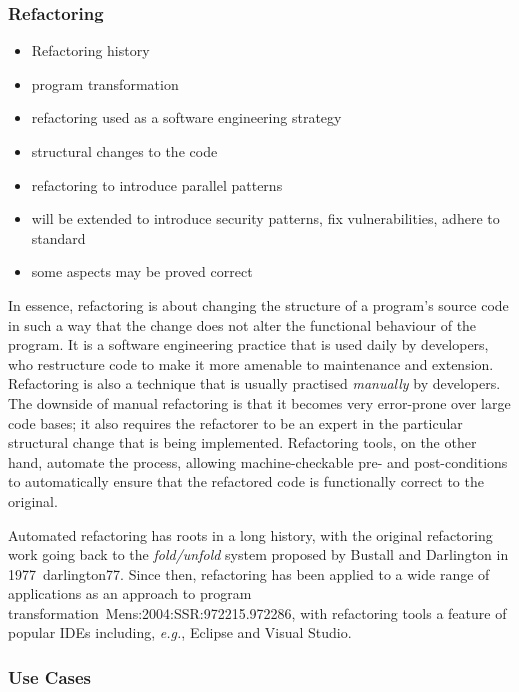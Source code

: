 \documentclass[a4paper,11pt]{article}
\begin{document}
\subsubsection{Refactoring}
\begin{itemize}
	\item Refactoring history
	\item program transformation
	\item refactoring used as a software engineering strategy
	\item structural changes to the code
	\item refactoring to introduce parallel patterns
	\item will be extended to introduce security patterns, fix vulnerabilities, adhere to standard
	\item some aspects may be proved correct
\end{itemize}

In essence, refactoring is about changing the structure of a program's source code in such a way that the change does not alter the functional behaviour of the program. It is a software engineering practice that is used daily by developers, who restructure code to make it more amenable to maintenance and extension. Refactoring is also a technique that is usually practised \emph{manually} by developers. The downside of manual refactoring is that it becomes very error-prone over large code bases; it also requires the refactorer to be an expert in the particular structural change that is being implemented. Refactoring tools, on the other hand, automate the process, allowing machine-checkable pre- and post-conditions to automatically ensure that the refactored code is functionally correct to the original. 

Automated refactoring has roots in a long history, with the original refactoring work going back to the \emph{fold/unfold} system proposed by Bustall and Darlington in 1977~\cite{cfs}{darlington77}. Since then, refactoring has been applied to a wide range of applications as an approach to program transformation~\cite{cfs}{Mens:2004:SSR:972215.972286}, with refactoring tools a feature of popular IDEs including, \textit{e.g.}, Eclipse and Visual Studio.

\subsubsection{Use Cases}
\label{sect:applications}
\label{sect:background-last}
\end{document}
